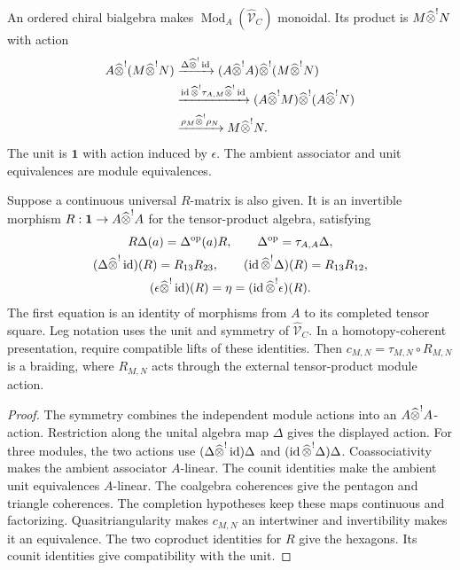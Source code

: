 \begin{theorem}\label{thm:vol4-representation-fusion}
An ordered chiral bialgebra makes
$\operatorname{Mod}_A(\widehat{\mathcal V}_C)$ monoidal.
Its product is $M\widehat{\otimes}^{!}N$ with action
\[
\begin{aligned}
 A\widehat{\otimes}^{!}(M\widehat{\otimes}^{!}N)
 &\xrightarrow{\Delta\widehat{\otimes}^{!}\operatorname{id}}
 (A\widehat{\otimes}^{!}A)\widehat{\otimes}^{!}
 (M\widehat{\otimes}^{!}N)\\
 &\xrightarrow{\operatorname{id}\widehat{\otimes}^{!}\tau_{A,M}
                       \widehat{\otimes}^{!}\operatorname{id}}
 (A\widehat{\otimes}^{!}M)\widehat{\otimes}^{!}
 (A\widehat{\otimes}^{!}N)\\
 &\xrightarrow{\rho_M\widehat{\otimes}^{!}\rho_N}
 M\widehat{\otimes}^{!}N.
\end{aligned}
\]
The unit is $\mathbf1$ with action induced by $\epsilon$.
The ambient associator and unit equivalences are module equivalences.

Suppose a continuous universal $R$-matrix is also given.
It is an invertible morphism
$R:\mathbf1\to A\widehat{\otimes}^{!}A$ for the tensor-product algebra,
satisfying
\[
\begin{gathered}
 R\Delta(a)=\Delta^{\mathrm{op}}(a)R,\qquad
 \Delta^{\mathrm{op}}=\tau_{A,A}\Delta,\\
 (\Delta\widehat{\otimes}^{!}\operatorname{id})(R)=R_{13}R_{23},
 \qquad
 (\operatorname{id}\widehat{\otimes}^{!}\Delta)(R)=R_{13}R_{12},\\
 (\epsilon\widehat{\otimes}^{!}\operatorname{id})(R)=\eta
 =(\operatorname{id}\widehat{\otimes}^{!}\epsilon)(R).
\end{gathered}
\]
The first equation is an identity of morphisms from $A$ to its completed tensor square.
Leg notation uses the unit and symmetry of $\widehat{\mathcal V}_C$.
In a homotopy-coherent presentation, require compatible lifts of these identities.
Then $c_{M,N}=\tau_{M,N}\circ R_{M,N}$ is a braiding,
where $R_{M,N}$ acts through the external tensor-product module action.
\end{theorem}
\begin{proof}
The symmetry combines the independent module actions into an
$A\widehat{\otimes}^{!}A$-action.
Restriction along the unital algebra map $\Delta$ gives the displayed action.
For three modules, the two actions use
$(\Delta\widehat{\otimes}^{!}\operatorname{id})\Delta$ and
$(\operatorname{id}\widehat{\otimes}^{!}\Delta)\Delta$.
Coassociativity makes the ambient associator $A$-linear.
The counit identities make the ambient unit equivalences $A$-linear.
The coalgebra coherences give the pentagon and triangle coherences.
The completion hypotheses keep these maps continuous and factorizing.
Quasitriangularity makes $c_{M,N}$ an intertwiner and invertibility makes it an equivalence.
The two coproduct identities for $R$ give the hexagons.
Its counit identities give compatibility with the unit.
\end{proof}

